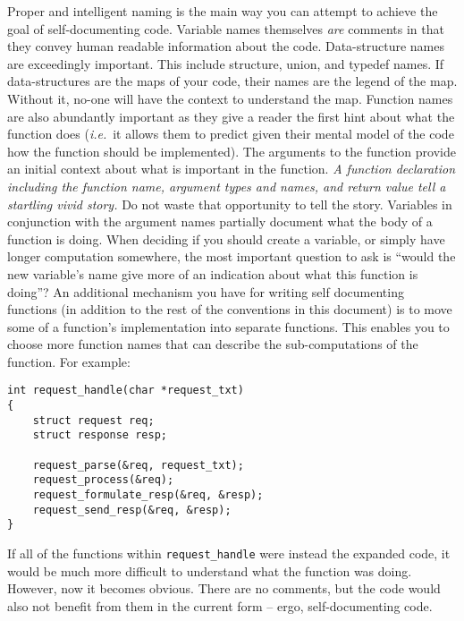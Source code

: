 \documentclass[11pt,onecolumn]{article}
\def\ie{\textit{i.e.}}
\newcommand{\head}[1]{\vspace{0.4em}\noindent{\bf #1}}
\begin{document}
\head{Toward writing self-documenting code.}  Proper and intelligent
naming is the main way you can attempt to achieve the goal of
self-documenting code.  Variable names themselves {\em are} comments
in that they convey human readable information about the code.
Data-structure names are exceedingly important.  This include
structure, union, and typedef names.  If data-structures are the maps
of your code, their names are the legend of the map.  Without it,
no-one will have the context to understand the map.  Function names
are also abundantly important as they give a reader the first hint
about what the function does (\ie\ it allows them to predict given
their mental model of the code how the function should be
implemented).  The arguments to the function provide an initial
context about what is important in the function.  {\em A function
  declaration including the function name, argument types and names,
  and return value tell a startling vivid story.}  Do not waste that
opportunity to tell the story.  Variables in conjunction with the
argument names partially document what the body of a function is
doing.  When deciding if you should create a variable, or simply have
longer computation somewhere, the most important question to ask is
``would the new variable's name give more of an indication about what
this function is doing''?  An additional mechanism you have for
writing self documenting functions (in addition to the rest of the
conventions in this document) is to move some of a function's
implementation into separate functions.  This enables you to choose
more function names that can describe the sub-computations of the
function.  For example:

    \begin{minipage}{3in}
      \footnotesize
      \lstset{language=C}
      \begin{lstlisting}
int request_handle(char *request_txt)
{
    struct request req;
    struct response resp;

    request_parse(&req, request_txt);
    request_process(&req);
    request_formulate_resp(&req, &resp);
    request_send_resp(&req, &resp);
}        
      \end{lstlisting}
    \end{minipage}

If all of the functions within {\tt request\_handle} were instead the
expanded code, it would be much more difficult to understand what the
function was doing.  However, now it becomes obvious.  There are no
comments, but the code would also not benefit from them in the current
form -- ergo, self-documenting code.
\end{document}

